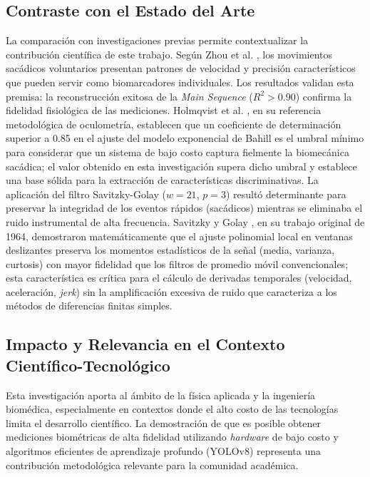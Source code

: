 \subsection{Contraste con el Estado del Arte}

La comparación con investigaciones previas permite contextualizar la contribución científica de este trabajo.
Según Zhou et al. \cite{zhou2024abnormal}, los movimientos sacádicos voluntarios presentan patrones de velocidad y precisión característicos que pueden servir como biomarcadores individuales.
Los resultados validan esta premisa: la reconstrucción exitosa de la \textit{Main Sequence} ($R^2 > 0.90$) confirma la fidelidad fisiológica de las mediciones.
Holmqvist et al. \cite{holmqvist2011eye}, en su referencia metodológica de oculometría, establecen que un coeficiente de determinación superior a 0.85 en el ajuste del modelo exponencial de Bahill es el umbral mínimo para considerar que un sistema de bajo costo captura fielmente la biomecánica sacádica;
el valor obtenido en esta investigación supera dicho umbral y establece una base sólida para la extracción de características discriminativas.
La aplicación del filtro Savitzky-Golay ($w=21$, $p=3$) resultó determinante para preservar la integridad de los eventos rápidos (sacádicos) mientras se eliminaba el ruido instrumental de alta frecuencia.
Savitzky y Golay \cite{savitzky1964smoothing}, en su trabajo original de 1964, demostraron matemáticamente que el ajuste polinomial local en ventanas deslizantes preserva los momentos estadísticos de la señal (media, varianza, curtosis) con mayor fidelidad que los filtros de promedio móvil convencionales;
esta característica es crítica para el cálculo de derivadas temporales (velocidad, aceleración, \textit{jerk}) sin la amplificación excesiva de ruido que caracteriza a los métodos de diferencias finitas simples.
\subsection{Impacto y Relevancia en el Contexto Científico-Tecnológico}

Esta investigación aporta al ámbito de la física aplicada y la ingeniería biomédica, especialmente en contextos donde el alto costo de las tecnologías limita el desarrollo científico.
La demostración de que es posible obtener mediciones biométricas de alta fidelidad utilizando \textit{hardware} de bajo costo y algoritmos eficientes de aprendizaje profundo (YOLOv8) representa una contribución metodológica relevante para la comunidad académica.
